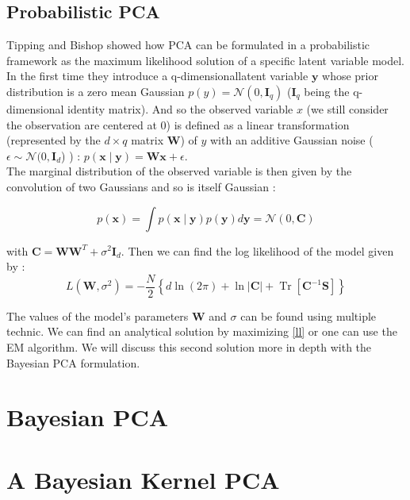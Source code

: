 \documentclass{article}
\begin{document}
\subsection{Probabilistic PCA}

Tipping and Bishop \cite{tipping1999ppca} showed how PCA can be formulated in a probabilistic framework as the maximum likelihood solution of a specific latent variable model.\\
In the first time they introduce a q-dimensionallatent variable $\mathbf{y}$ whose prior distribution is a zero mean Gaussian $p(y) = \mathcal{N}(0,\mathbf{I}_q) $ ($\mathbf{I}_q$ being the q-dimensional identity matrix). And so the observed variable $x$ (we still consider the observation are centered at 0) is defined as a linear transformation (represented by the $d \times q$ matrix $\mathbf{W}$) of $y$ with an additive Gaussian noise ($\epsilon \sim \mathcal{N}(0,\mathbf{I}_d$) )  : $p(\mathbf{x} \mid \mathbf{y}) = \mathbf{W} \mathbf{x} + \epsilon$.\\
The marginal distribution of the observed variable is then given by the convolution of two Gaussians and so is itself Gaussian :

$$p(\mathbf{x})=\int p(\mathbf{x} \mid \mathbf{y}) p(\mathbf{y}) d \mathbf{y}=\mathcal{N}(0, \mathbf{C})$$

with $\mathbf{C} = \mathbf{W} \mathbf{W}^T + \sigma^2 \mathbf{I}_d $. Then we can find the log likelihood of the model given by  :
\begin{equation}
    L\left(\mathbf{W}, \sigma^{2}\right)=-\frac{N}{2}\left\{d \ln (2 \pi)+\ln |\mathbf{C}|+\operatorname{Tr}\left[\mathbf{C}^{-1} \mathbf{S}\right]\right\}
    \label{ll}
\end{equation}

The values of the model's parameters $\mathbf{W}$ and $\sigma$ can be found using multiple technic. We can find an analytical solution by maximizing \ref{ll} or one can use the EM algorithm. We will discuss this second solution more in depth with the Bayesian PCA formulation.

\section{Bayesian PCA}


\section{A Bayesian Kernel PCA}
\end{document}
